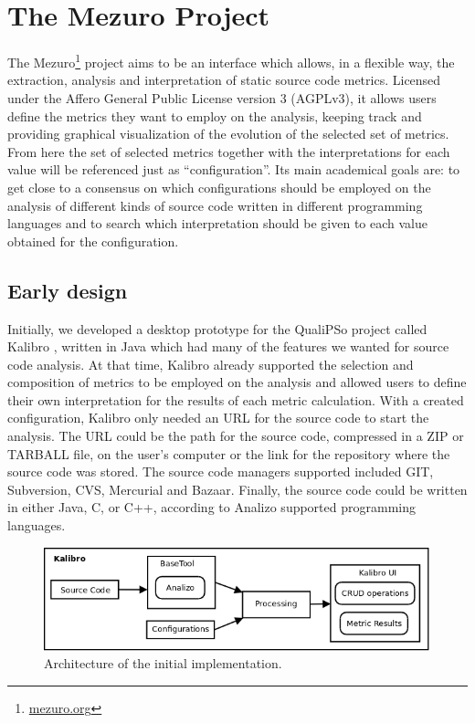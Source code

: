 \section{The Mezuro Project}
\label{sec:mezuro}

The Mezuro\footnote{\url{mezuro.org}} project aims to be an interface
which allows, in a flexible way, the extraction, analysis and interpretation of
static source code metrics. Licensed under the Affero General Public License
version 3 (AGPLv3), it allows users define the metrics they want to employ on
the analysis, keeping track and providing graphical visualization of the
evolution of the selected set of metrics. From here the set of selected metrics
together with the interpretations for each value  will be referenced just as
``configuration''. Its main academical goals are: to get close to a consensus
on which configurations should be employed on the analysis of different kinds
of source code written in different programming languages and to search which
interpretation should be given to each value obtained for the configuration.

\subsection{Early design}
\label{subsec:early-design}

Initially, we developed a desktop prototype for the QualiPSo project called
Kalibro \cite{de2013kalibro}, written in Java which had many of the features we
wanted for source code analysis. At that time, Kalibro already supported the
selection and composition of metrics to be employed on the analysis and allowed
users to define their own interpretation for the results of each metric
calculation.  With a created configuration, Kalibro only needed an URL for the
source code to start the analysis. The URL could be the path for the source
code, compressed in a ZIP or TARBALL file, on the user's computer or the link
for the repository where the source code was stored. The source code managers
supported included GIT, Subversion, CVS, Mercurial and Bazaar. Finally, the
source code could be written in either Java, C, or C++, according to Analizo
supported programming languages.

\begin{figure}[htb]
  \centering
  \includegraphics[width=\textwidth]{images/kalibro-initial-arch.png}
  \caption{Architecture of the initial implementation.}
  \label{fig:kalibro-initial-arch}
\end{figure}

